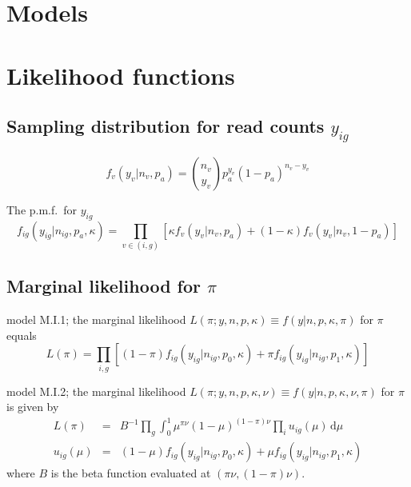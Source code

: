 \documentclass[letterpaper]{article}
\begin{document}
\section{Models}
\label{sec:models}

\renewcommand{\thesubsection}{M\arabic{model}}

\subsection{}
\label{sec:model-basic}

\section{Likelihood functions}
\label{sec:likelihood}

\subsection{Sampling distribution for read counts \(y_{ig}\)}

\begin{equation}
f_v(y_v | n_v, p_a) = \binom{n_v}{y_v} p_a^{y_v} (1-p_a)^{n_v-y_v}
\end{equation}

The p.m.f.~for \(y_{ig}\)
\begin{equation}
f_{ig}(y_{ig} | n_{ig}, p_a, \kappa) = \prod_{v\in(i,g)}
\left[
\kappa f_v(y_v | n_v, p_a) +
(1-\kappa) f_v(y_v | n_v, 1-p_a)
\right]
\end{equation}

\subsection{Marginal likelihood for \(\pi\)}
\label{sec:marginal-likelihood-pi}

model M.I.1; the marginal likelihood \(L(\pi;y,n,p,\kappa)\equiv f(y|n,p,\kappa,\pi)\) for \(\pi\) equals
\begin{equation}
L(\pi) = \prod_{i,g}
\left[
(1-\pi) f_{ig}(y_{ig} | n_{ig}, p_0, \kappa)
+
\pi f_{ig}(y_{ig} | n_{ig}, p_1, \kappa)
\right]
\end{equation}

model M.I.2; the marginal likelihood \(L(\pi;y,n,p,\kappa,\nu)\equiv
f(y|n,p,\kappa,\nu,\pi)\) for \(\pi\) is given by
\begin{eqnarray}
L(\pi) &=& B^{-1} \prod_{g} \int_{0}^{1} \mu^{\pi\nu} (1-\mu)^{(1-\pi)\nu}
\prod_{i}
u_{ig}(\mu) \, \mathrm{d}\mu
\\
u_{ig}(\mu) &=&
(1-\mu) f_{ig}(y_{ig} | n_{ig}, p_0, \kappa)
+
\mu f_{ig}(y_{ig} | n_{ig}, p_1, \kappa)
\end{eqnarray}
where \(B\) is the beta function evaluated at \((\pi\nu, (1-\pi)\nu)\).
\end{document}

